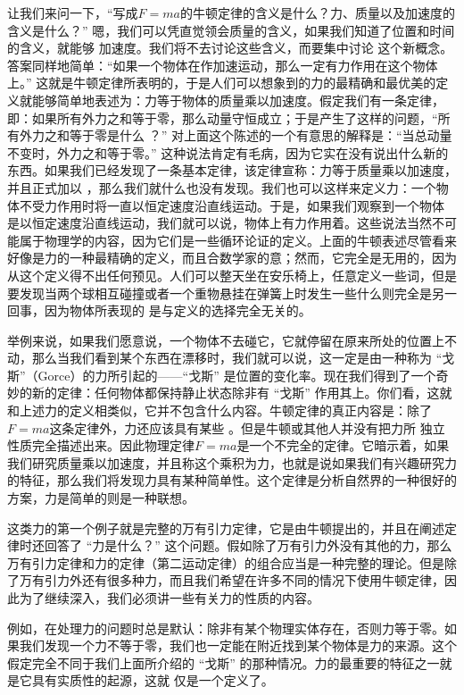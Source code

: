 \documentclass[12pt,oneside]{book}
\begin{document}
让我们来问一下，“写成$F=ma$的牛顿定律的含义是什么？力、质量以及加速度的含义是什么？” 嗯，我们可以凭直觉领会质量的含义，如果我们知道了位置和时间的含义，就能够  加速度。我们将不去讨论这些含义，而要集中讨论  这个新概念。答案同样地简单：“如果一个物体在作加速运动，那么一定有力作用在这个物体上。” 这就是牛顿定律所表明的，于是人们可以想象到的力的最精确和最优美的定义就能够简单地表述为：力等于物体的质量乘以加速度。假定我们有一条定律，即：如果所有外力之和等于零，那么动量守恒成立；于是产生了这样的问题，“所有外力之和等于零是什么 ？” 对上面这个陈述的一个有意思的解释是：“当总动量不变时，外力之和等于零。” 这种说法肯定有毛病，因为它实在没有说出什么新的东西。如果我们已经发现了一条基本定律，该定律宣称：力等于质量乘以加速度，并且正式加以 ，那么我们就什么也没有发现。我们也可以这样来定义力：一个物体不受力作用时将一直以恒定速度沿直线运动。于是，如果我们观察到一个物体  是以恒定速度沿直线运动，我们就可以说，物体上有力作用着。这些说法当然不可能属于物理学的内容，因为它们是一些循环论证的定义。上面的牛顿表述尽管看来好像是力的一种最精确的定义，而且合数学家的意；然而，它完全是无用的，因为从这个定义得不出任何预见。人们可以整天坐在安乐椅上，任意定义一些词，但是要发现当两个球相互碰撞或者一个重物悬挂在弹簧上时发生一些什么则完全是另一回事，因为物体所表现的  是与定义的选择完全无关的。


举例来说，如果我们愿意说，一个物体不去碰它，它就停留在原来所处的位置上不动，那么当我们看到某个东西在漂移时，我们就可以说，这一定是由一种称为 “戈斯”（Gorce）的力所引起的——“戈斯” 是位置的变化率。现在我们得到了一个奇妙的新的定律：任何物体都保持静止状态除非有 “戈斯” 作用其上。你们看，这就和上述力的定义相类似，它并不包含什么内容。牛顿定律的真正内容是：除了$F=ma$这条定律外，力还应该具有某些 。但是牛顿或其他人并没有把力所  独立性质完全描述出来。因此物理定律$F=ma$是一个不完全的定律。它暗示着，如果我们研究质量乘以加速度，并且称这个乘积为力，也就是说如果我们有兴趣研究力的特征，那么我们将发现力具有某种简单性。这个定律是分析自然界的一种很好的方案，力是简单的则是一种联想。


这类力的第一个例子就是完整的万有引力定律，它是由牛顿提出的，并且在阐述定律时还回答了 “力是什么？” 这个问题。假如除了万有引力外没有其他的力，那么万有引力定律和力的定律（第二运动定律）的组合应当是一种完整的理论。但是除了万有引力外还有很多种力，而且我们希望在许多不同的情况下使用牛顿定律，因此为了继续深入，我们必须讲一些有关力的性质的内容。


例如，在处理力的问题时总是默认：除非有某个物理实体存在，否则力等于零。如果我们发现一个力不等于零，我们也一定能在附近找到某个物体是力的来源。这个假定完全不同于我们上面所介绍的 “戈斯” 的那种情况。力的最重要的特征之一就是它具有实质性的起源，这就  仅是一个定义了。
\end{document}
